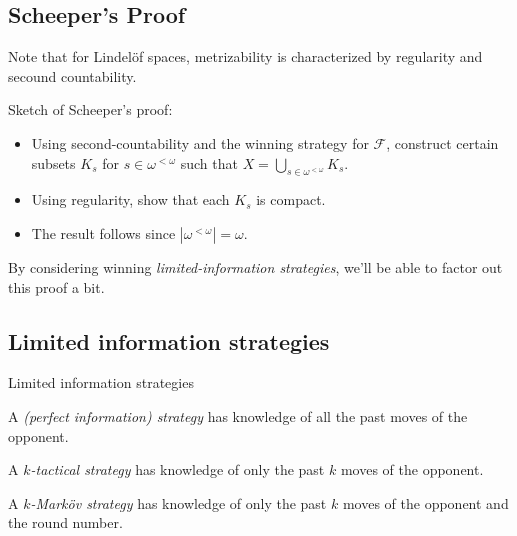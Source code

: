 \documentclass{beamer}
\theoremstyle{definition}
\newcommand{\<}{\langle}
\renewcommand{\>}{\rangle}
\newcommand{\pl}[1]{\mathscr{#1}}
\newcommand{\term}{\textit}
\begin{document}
\subsection{Scheeper's Proof}

\begin{frame}
  Note that for Lindel\"of spaces, metrizability is characterized by regularity
  and secound countability.

  \vpause

  Sketch of Scheeper's proof:
  \begin{itemize}
    \item Using second-countability and the winning strategy for $\pl F$,
          construct certain subsets $K_s$ for $s \in \omega^{<\omega}$ such
          that $X = \bigcup_{s\in\omega^{<\omega}}K_s$.
    \item Using regularity, show that each $K_s$ is compact.
    \item The result follows since $|\omega^{<\omega}|=\omega$.
  \end{itemize}

  \vpause

  By considering winning \term{limited-information strategies}, we'll be able
  to factor out this proof a bit.
\end{frame}

\subsection{Limited information strategies}

\begin{frame}{Limited information strategies}
  \begin{definition}
    A \term{(perfect information) strategy} has knowledge of all the past
    moves of the opponent.
  \end{definition}

  \pause

  \begin{definition}
    A \term{$k$-tactical strategy} has knowledge of only the past $k$
    moves of the opponent.
  \end{definition}

  \pause

  \begin{definition}
    A \term{$k$-Mark\"ov strategy} has knowledge of only the past $k$
    moves of the opponent and the round number.
  \end{definition}
\end{frame}
\end{document}
